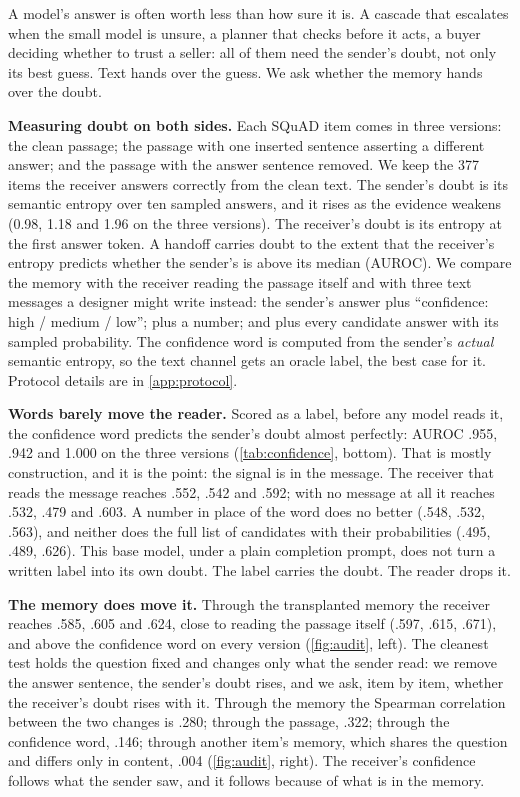 \documentclass{article}
\begin{document}
A model's answer is often worth less than how sure it is. A cascade that escalates when the small model is unsure, a planner that checks before it acts, a buyer deciding whether to trust a seller: all of them need the sender's doubt, not only its best guess. Text hands over the guess. We ask whether the memory hands over the doubt.

\textbf{Measuring doubt on both sides.} Each SQuAD item comes in three versions: the clean passage; the passage with one inserted sentence asserting a different answer; and the passage with the answer sentence removed. We keep the 377 items the receiver answers correctly from the clean text. The sender's doubt is its semantic entropy \citep{farquhar2024detecting} over ten sampled answers, and it rises as the evidence weakens (0.98, 1.18 and 1.96 on the three versions). The receiver's doubt is its entropy at the first answer token. A handoff carries doubt to the extent that the receiver's entropy predicts whether the sender's is above its median (AUROC). We compare the memory with the receiver reading the passage itself and with three text messages a designer might write instead: the sender's answer plus ``confidence: high / medium / low''; plus a number; and plus every candidate answer with its sampled probability. The confidence word is computed from the sender's \emph{actual} semantic entropy, so the text channel gets an oracle label, the best case for it. Protocol details are in \cref{app:protocol}.

\textbf{Words barely move the reader.} Scored as a label, before any model reads it, the confidence word predicts the sender's doubt almost perfectly: AUROC .955, .942 and 1.000 on the three versions (\cref{tab:confidence}, bottom). That is mostly construction, and it is the point: the signal is in the message. The receiver that reads the message reaches .552, .542 and .592; with no message at all it reaches .532, .479 and .603. A number in place of the word does no better (.548, .532, .563), and neither does the full list of candidates with their probabilities (.495, .489, .626). This base model, under a plain completion prompt, does not turn a written label into its own doubt. The label carries the doubt. The reader drops it.

\textbf{The memory does move it.} Through the transplanted memory the receiver reaches .585, .605 and .624, close to reading the passage itself (.597, .615, .671), and above the confidence word on every version (\cref{fig:audit}, left). The cleanest test holds the question fixed and changes only what the sender read: we remove the answer sentence, the sender's doubt rises, and we ask, item by item, whether the receiver's doubt rises with it. Through the memory the Spearman correlation between the two changes is .280; through the passage, .322; through the confidence word, .146; through another item's memory, which shares the question and differs only in content, .004 (\cref{fig:audit}, right). The receiver's confidence follows what the sender saw, and it follows because of what is in the memory.
\end{document}
